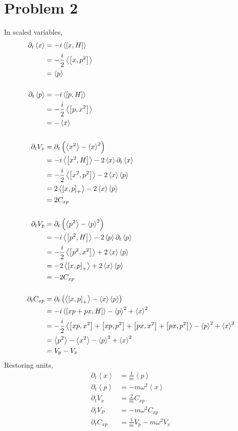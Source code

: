 \documentclass[12pt]{article}
\newcommand{\avg}[1]{\left<#1\right>}
\begin{document}
\section*{Problem 2}
In scaled variables,
\begin{align*}
    \partial_t\avg{x} & = -i\avg{\comm{x}{H}} \\
    & = -\frac{i}{2}\avg{\comm{x}{p^2}} \\
    & = \avg{p} \\ \\
    \partial_t\avg{p} & = -i\avg{\comm{p}{H}} \\
    & = -\frac{i}{2}\avg{\comm{p}{x^2}} \\
    & = -\avg{x} \\ \\
    \partial_tV_x & = \partial_t\left(\avg{x^2} - \avg{x}^2\right) \\
    & = -i\avg{\comm{x^2}{H}} - 2\avg{x}\partial_t\avg{x} \\
    & = -\frac{i}{2}\avg{\comm{x^2}{p^2}} - 2\avg{x}\avg{p} \\
    & = 2\avg{\comm{x}{p}_+} - 2\avg{x}\avg{p} \\
    & = 2C_{xp} \\ \\
    \partial_tV_p & = \partial_t\left(\avg{p^2} - \avg{p}^2\right) \\
    & = -i\avg{\comm{p^2}{H}} - 2\avg{p}\partial_t\avg{p} \\
    & = -\frac{i}{2}\avg{\comm{p^2}{x^2}} + 2\avg{x}\avg{p} \\
    & = -2\avg{\comm{x}{p}_+} + 2\avg{x}\avg{p} \\
    & = -2C_{xp} \\ \\
    \partial_tC_{xp} & = \partial_t\left(\avg{\comm{x}{p}_+} - \avg{x}\avg{p}\right) \\
    & = -i\avg{\comm{xp + px}{H}} - \avg{p}^2 + \avg{x}^2 \\
    & = -\frac{i}{2}\avg{\comm{xp}{x^2} + \comm{xp}{p^2} + \comm{px}{x^2} + \comm{px}{p^2}} - \avg{p}^2 + \avg{x}^2 \\
    & = \avg{p^2} - \avg{x^2} - \avg{p}^2 + \avg{x}^2 \\
    & = V_p - V_x 
\end{align*}
Restoring units,
\begin{align*}
    \partial_t\avg{x} & = \frac{1}{m}\avg{p} \\
    \partial_t\avg{p} & = -m\omega^2\avg{x} \\
    \partial_tV_x & = \frac{2}{m}C_{xp} \\
    \partial_tV_P & = -m\omega^2C_{xp} \\
    \partial_tC_{xp} & = \frac{1}{m}V_p - m\omega^2V_x
\end{align*}
\end{document}
